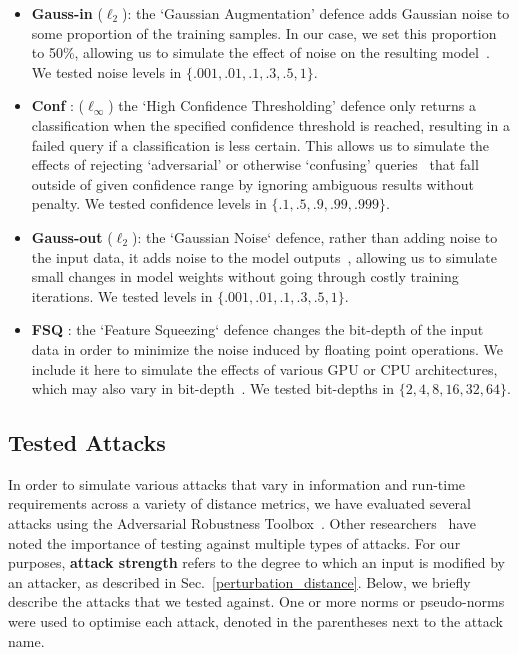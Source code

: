 \begin{itemize}
    \item \textbf{Gauss-in} ($\ell_2$): the `Gaussian Augmentation' defence adds Gaussian noise to some proportion of the training samples. In our case, we set this proportion to 50\%, allowing us to simulate the effect of noise  on the resulting model~\citep{gauss_aug}. We tested noise levels in $\{.001, .01, .1, .3, .5, 1\}$.
    \item \textbf{Conf} : ($\ell_{\infty}$) the `High Confidence Thresholding' defence only returns a classification when the specified confidence threshold is reached, resulting in a failed query if a classification is less certain. This allows us to simulate the effects of rejecting `adversarial' or otherwise `confusing' queries~\citep{high_conf} that fall outside of given confidence range by ignoring ambiguous results without penalty. We tested confidence levels in $\{.1, .5, .9, .99, .999\}$.
    \item \textbf{Gauss-out} ($\ell_2$): the `Gaussian Noise` defence, rather than adding noise to the input data, it adds  noise to the model outputs~\citep{gauss_out}, allowing us to simulate small changes in model weights without going through costly training iterations. We tested levels in $\{.001, .01, .1, .3, .5, 1\}$.
    \item \textbf{FSQ} : the `Feature Squeezing` defence changes the bit-depth of the input data in order to minimize the noise induced by floating point operations. We include it here to simulate the effects of various GPU or CPU architectures, which may also vary in bit-depth~\citep{feature_squeezing}. We tested bit-depths in $\{2, 4, 8, 16, 32, 64\}$.
\end{itemize}

\subsection{Tested Attacks}
\label{attacks}
In order to simulate various attacks that vary in information and run-time requirements across a variety of distance metrics, we have evaluated several attacks using the Adversarial Robustness Toolbox~\citep{art2018}. Other researchers~\citep{carlini_towards_2017} have noted the importance of testing against multiple types of attacks. For our purposes, \textbf{attack strength} refers to the degree to which an input is modified by an attacker, as described in Sec.~\ref{perturbation_distance}. Below, we briefly describe the attacks that we tested against. One or more norms or pseudo-norms were used to optimise each attack, denoted in the parentheses next to the attack name.

